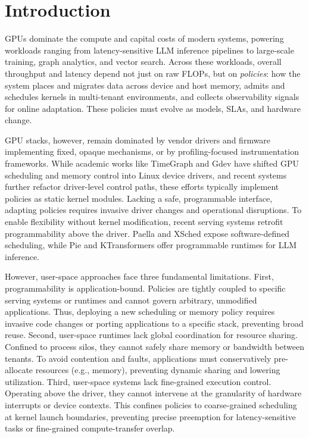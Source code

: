 \section{Introduction}

GPUs dominate the compute and capital costs of modern systems, powering workloads ranging from latency-sensitive LLM inference pipelines to large-scale training, graph analytics, and vector search. Across these workloads, overall throughput and latency depend not just on raw FLOPs, but on \emph{policies}: how the system places and migrates data across device and host memory, admits and schedules kernels in multi-tenant environments, and collects observability signals for online adaptation. These policies must evolve as models, SLAs, and hardware change.

GPU stacks, however, remain dominated by vendor drivers and firmware implementing fixed, opaque mechanisms, or by profiling-focused instrumentation frameworks\cite{cupti,villa2019nvbit,neutrino,egpu}. While academic works like TimeGraph and Gdev have shifted GPU scheduling and memory control into Linux device drivers\cite{timegraph,gdev}, and recent systems further refactor driver-level control paths\cite{kernelintercept,gpreempt,lithos}, these efforts typically implement policies as static kernel modules. Lacking a safe, programmable interface, adapting policies requires invasive driver changes and operational disruptions. To enable flexibility without kernel modification, recent serving systems retrofit programmability above the driver.  Paella\cite{paella} and XSched\cite{xsched} expose software-defined scheduling, while Pie\cite{pie} and KTransformers\cite{ktransformers} offer programmable runtimes for LLM inference. 

However, user-space approaches face three fundamental limitations. First, programmability is application-bound. Policies are tightly coupled to specific serving systems or runtimes and cannot govern arbitrary, unmodified applications. Thus, deploying a new scheduling or memory policy requires invasive code changes or porting applications to a specific stack, preventing broad reuse. Second, user-space runtimes lack global coordination for resource sharing. Confined to process silos, they cannot safely share memory or bandwidth between tenants. To avoid contention and faults, applications must conservatively pre-allocate resources (e.g., memory), preventing dynamic sharing and lowering utilization. Third, user-space systems lack fine-grained execution control. Operating above the driver, they cannot intervene at the granularity of hardware interrupts or device contexts. This confines policies to coarse-grained scheduling at kernel launch boundaries, preventing precise preemption for latency-sensitive tasks or fine-grained compute-transfer overlap.

